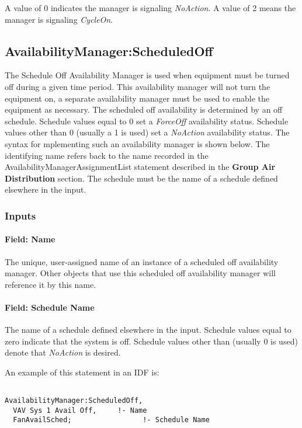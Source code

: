 A value of 0 indicates the manager is signaling \emph{NoAction}. A value of 2 means the manager is signaling \emph{CycleOn}.

\subsection{AvailabilityManager:ScheduledOff}\label{availabilitymanagerscheduledoff}

The Schedule Off Availability Manager is used when equipment must be turned off during a given time period. This availability manager will not turn the equipment on, a separate availability manager must be used to enable the equipment as necessary. The scheduled off availability is determined by an off schedule. Schedule values equal to 0 set a \emph{ForceOff} availability status. Schedule values other than 0 (usually a 1 is used) set a \emph{NoAction} availability status. The syntax for mplementing such an availability manager is shown below. The identifying name refers back to the name recorded in the AvailabilityManagerAssignmentList statement described in the \textbf{Group Air Distribution} section. The schedule must be the name of a schedule defined elsewhere in the input.

\subsubsection{Inputs}\label{inputs-2-041}

\paragraph{Field: Name}\label{field-name-2-038}

The unique, user-assigned name of an instance of a scheduled off availability manager. Other objects that use this scheduled off availability manager will reference it by this name.

\paragraph{Field: Schedule Name}\label{field-schedule-name-2-003}

The name of a schedule defined elsewhere in the input. Schedule values equal to zero indicate that the system is off. Schedule values other than (usually 0 is used) denote that \emph{NoAction} is desired.

An example of this statement in an IDF is:

\begin{lstlisting}

AvailabilityManager:ScheduledOff,
  VAV Sys 1 Avail Off,     !- Name
  FanAvailSched;                 !- Schedule Name
\end{lstlisting}

